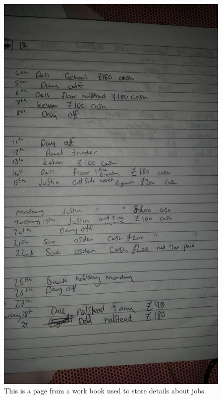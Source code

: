 \begin{figure}[H]
    \includegraphics[width=\textwidth]{./Analysis/images/workbookPage.jpg}
    \caption{This is a page from a work book used to store details about jobs.} \label{fig:work_book_page}
\end{figure}

